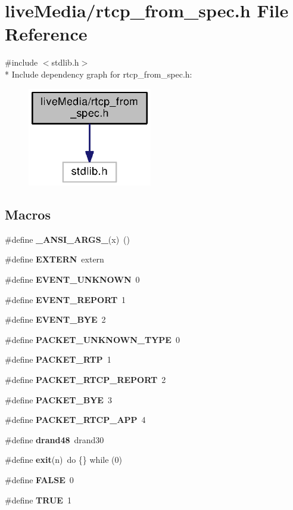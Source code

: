 \section{live\+Media/rtcp\+\_\+from\+\_\+spec.h File Reference}
\label{rtcp__from__spec_8h}
{\ttfamily \#include $<$stdlib.\+h$>$}\\*
Include dependency graph for rtcp\+\_\+from\+\_\+spec.\+h\+:
\nopagebreak
\begin{figure}[H]
\begin{center}
\leavevmode
\includegraphics[width=154pt]{rtcp__from__spec_8h__incl}
\end{center}
\end{figure}
\subsection*{Macros}
\begin{DoxyCompactItemize}
\item 
\#define {\bf \+\_\+\+A\+N\+S\+I\+\_\+\+A\+R\+G\+S\+\_\+}(x)~()
\item 
\#define {\bf E\+X\+T\+E\+R\+N}~extern
\item 
\#define {\bf E\+V\+E\+N\+T\+\_\+\+U\+N\+K\+N\+O\+W\+N}~0
\item 
\#define {\bf E\+V\+E\+N\+T\+\_\+\+R\+E\+P\+O\+R\+T}~1
\item 
\#define {\bf E\+V\+E\+N\+T\+\_\+\+B\+Y\+E}~2
\item 
\#define {\bf P\+A\+C\+K\+E\+T\+\_\+\+U\+N\+K\+N\+O\+W\+N\+\_\+\+T\+Y\+P\+E}~0
\item 
\#define {\bf P\+A\+C\+K\+E\+T\+\_\+\+R\+T\+P}~1
\item 
\#define {\bf P\+A\+C\+K\+E\+T\+\_\+\+R\+T\+C\+P\+\_\+\+R\+E\+P\+O\+R\+T}~2
\item 
\#define {\bf P\+A\+C\+K\+E\+T\+\_\+\+B\+Y\+E}~3
\item 
\#define {\bf P\+A\+C\+K\+E\+T\+\_\+\+R\+T\+C\+P\+\_\+\+A\+P\+P}~4
\item 
\#define {\bf drand48}~drand30
\item 
\#define {\bf exit}(n)~do \{\} while (0)
\item 
\#define {\bf F\+A\+L\+S\+E}~0
\item 
\#define {\bf T\+R\+U\+E}~1
\end{DoxyCompactItemize}
